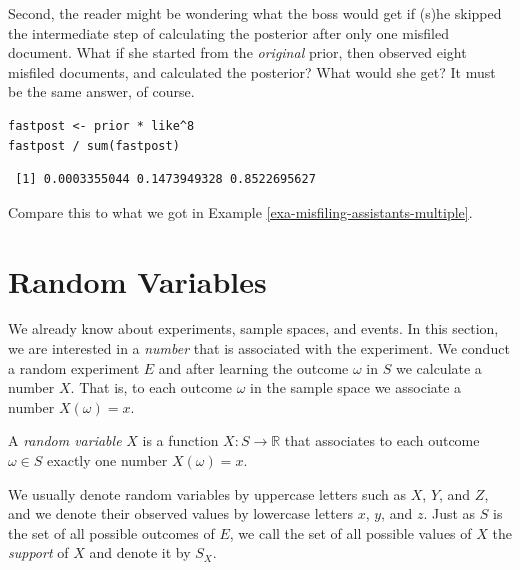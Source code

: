 \documentclass[captions=tableheading]{scrbook}
\begin{document}
Second, the reader might be wondering what the boss would get if (s)he skipped the intermediate step of calculating the posterior after only one misfiled document. What if she started from the \emph{original} prior, then observed eight misfiled documents, and calculated the posterior? What would she get? It must be the same answer, of course.


\begin{verbatim}
fastpost <- prior * like^8
fastpost / sum(fastpost)
\end{verbatim}

\begin{verbatim}
 [1] 0.0003355044 0.1473949328 0.8522695627
\end{verbatim}

Compare this to what we got in Example \ref{exa-misfiling-assistants-multiple}.
\section{Random Variables}
\label{sec-4-9}
\label{sec-Random-Variables}


We already know about experiments, sample spaces, and events. In this section, we are interested in a \emph{number} that is associated with the experiment. We conduct a random experiment \(E\) and after learning the outcome \(\omega\) in \(S\) we calculate a number \(X\). That is, to each outcome \(\omega\) in the sample space we associate a number \(X(\omega)=x\). 

\begin{defn}
A \emph{random variable} \(X\) is a function \(X:S\to\mathbb{R}\) that associates to each outcome \(\omega\in S\) exactly one number \(X(\omega)=x\). 
\end{defn}

We usually denote random variables by uppercase letters such as \(X\), \(Y\), and \(Z\), and we denote their observed values by lowercase letters \(x\), \(y\), and \(z\). Just as \(S\) is the set of all possible outcomes of \(E\), we call the set of all possible values of \(X\) the \emph{support} of \(X\) and denote it by \(S_{X}\).
\end{document}
